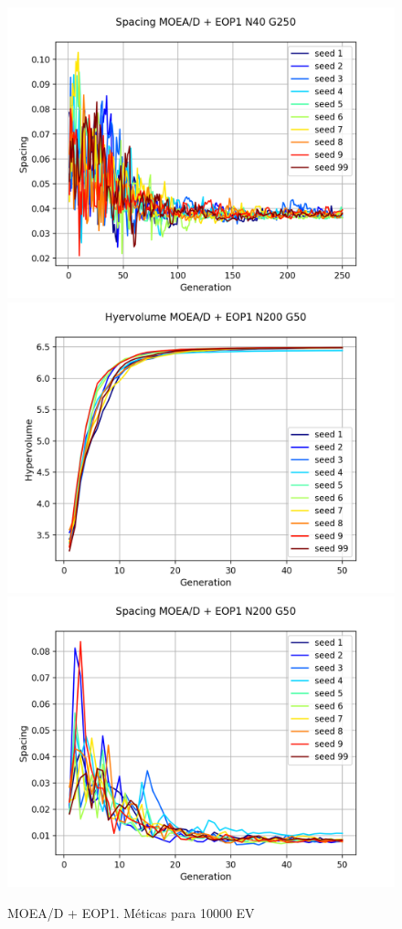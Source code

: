 \begin{figure}[H]
\includegraphics[scale=0.5]{figures/METRICS_EOP1/Spacing_N40_G250.png}\\
\includegraphics[scale=0.5]{figures/METRICS_EOP1/Hypervol_N200_G50.png}\quad 
\includegraphics[scale=0.5]{figures/METRICS_EOP1/Spacing_N200_G50.png}\\
\caption{MOEA/D + EOP1. Méticas para 10000 EV}
\label{fig:6}
\end{figure}

